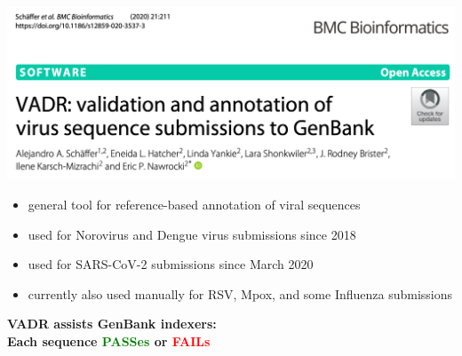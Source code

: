 \documentclass[landscape]{slides}
\begin{document}
\begin{slide}
\begin{center}
\includegraphics[width=10in]{figs/vadr-title-paper}

\begin{itemize}
\item general tool for reference-based annotation of viral sequences
\item used for Norovirus and Dengue virus submissions since 2018
\item used for SARS-CoV-2 submissions since March 2020 
\item currently also used manually for RSV, Mpox, and some Influenza submissions
\end{itemize}

\vfill
\end{center}
\end{slide}
\begin{slide}
\begin{center}
\large{\textbf{VADR assists GenBank indexers: \\ Each sequence \textcolor{green}{PASSes} or \textcolor{red}{FAILs}}}
\end{center}


\vfill
\end{slide}
\end{document}
